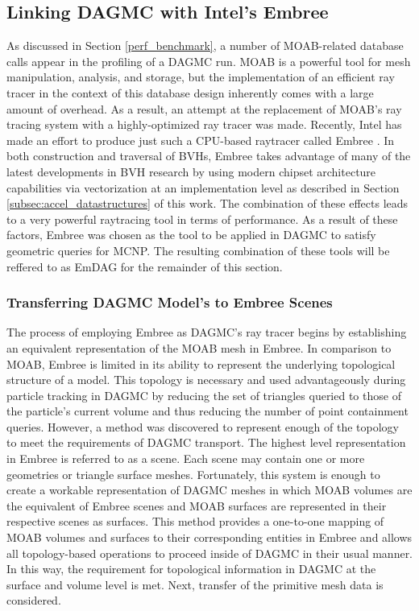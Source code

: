 \documentclass[12pt, a4paper]{article}
\begin{document}
\subsection{Linking DAGMC with Intel's Embree}%
\label{emdag}

As discussed in Section \ref{perf_benchmark}, a number of MOAB-related database calls appear in the profiling of a DAGMC run. MOAB is a powerful tool for mesh manipulation, analysis, and storage, but the implementation of an efficient ray tracer in the context of this database design inherently comes with a large amount of overhead. As a result, an attempt at the replacement of MOAB's ray tracing system with a highly-optimized ray tracer was made. Recently, Intel has made an effort to produce just such a CPU-based raytracer called Embree \cite{Wald_2014}. In both construction and traversal of BVHs, Embree takes advantage of many of the latest developments in BVH research by using modern chipset architecture capabilities via vectorization at an implementation level as described in Section \ref{subsec:accel_datastructures} of this work. The combination of these effects leads to a very powerful raytracing tool in terms of performance. As a result of these factors, Embree was chosen as the tool to be applied in DAGMC to satisfy geometric queries for MCNP. The resulting combination of these tools will be reffered to as EmDAG for the remainder of this section.

\subsubsection{Transferring DAGMC Model's to Embree Scenes}%

The process of employing Embree as DAGMC's ray tracer begins by establishing an equivalent representation of the MOAB mesh in Embree. In comparison to MOAB, Embree is limited in its ability to represent the underlying topological structure of a model. This topology is necessary and used advantageously during particle tracking in DAGMC by reducing the set of triangles queried to those of the particle's current volume and thus reducing the number of point containment queries. However, a method was discovered to represent enough of the topology to meet the requirements of DAGMC transport. The highest level representation in Embree is referred to as a scene. Each scene may contain one or more geometries or triangle surface meshes. Fortunately, this system is enough to create a workable representation of DAGMC meshes in which MOAB volumes are the equivalent of Embree scenes and MOAB surfaces are represented in their respective scenes as surfaces. This method provides a one-to-one mapping of MOAB volumes and surfaces to their corresponding entities in Embree and allows all topology-based operations to proceed inside of DAGMC in their usual manner. In this way, the requirement for topological information in DAGMC at the surface and volume level is met. Next, transfer of the primitive mesh data is considered.
\end{document}
